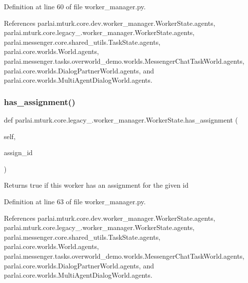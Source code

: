 Definition at line 60 of file worker\+\_\+manager.\+py.



References parlai.\+mturk.\+core.\+dev.\+worker\+\_\+manager.\+Worker\+State.\+agents, parlai.\+mturk.\+core.\+legacy\+\_.\+worker\+\_\+manager.\+Worker\+State.\+agents, parlai.\+messenger.\+core.\+shared\+\_\+utils.\+Task\+State.\+agents, parlai.\+core.\+worlds.\+World.\+agents, parlai.\+messenger.\+tasks.\+overworld\+\_\+demo.\+worlds.\+Messenger\+Chat\+Task\+World.\+agents, parlai.\+core.\+worlds.\+Dialog\+Partner\+World.\+agents, and parlai.\+core.\+worlds.\+Multi\+Agent\+Dialog\+World.\+agents.

\mbox{\label{classparlai_1_1mturk_1_1core_1_1legacy__2018_1_1worker__manager_1_1WorkerState_a71a385a16ef2f33d32cde9050350580c}} 
\subsubsection{\texorpdfstring{has\+\_\+assignment()}{has\_assignment()}}
{\footnotesize\ttfamily def parlai.\+mturk.\+core.\+legacy\+\_.\+worker\+\_\+manager.\+Worker\+State.\+has\+\_\+assignment (\begin{DoxyParamCaption}\item[{}]{self,  }\item[{}]{assign\+\_\+id }\end{DoxyParamCaption})}

\begin{DoxyVerb}Returns true if this worker has an assignment for the given id\end{DoxyVerb}
 

Definition at line 63 of file worker\+\_\+manager.\+py.



References parlai.\+mturk.\+core.\+dev.\+worker\+\_\+manager.\+Worker\+State.\+agents, parlai.\+mturk.\+core.\+legacy\+\_.\+worker\+\_\+manager.\+Worker\+State.\+agents, parlai.\+messenger.\+core.\+shared\+\_\+utils.\+Task\+State.\+agents, parlai.\+core.\+worlds.\+World.\+agents, parlai.\+messenger.\+tasks.\+overworld\+\_\+demo.\+worlds.\+Messenger\+Chat\+Task\+World.\+agents, parlai.\+core.\+worlds.\+Dialog\+Partner\+World.\+agents, and parlai.\+core.\+worlds.\+Multi\+Agent\+Dialog\+World.\+agents.



